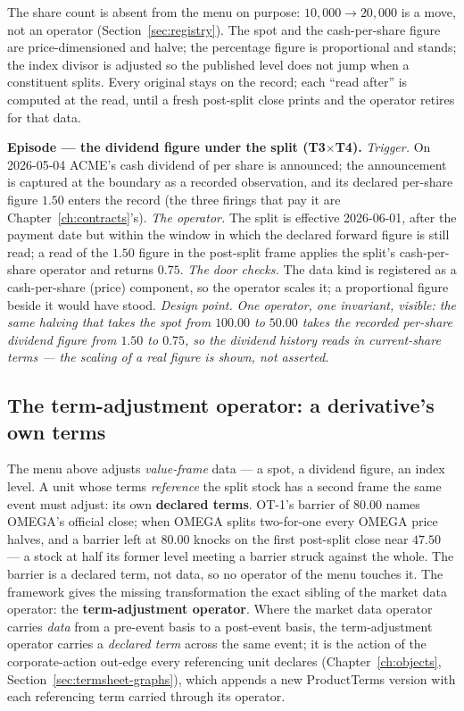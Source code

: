 \noindent The share count is absent from the menu on purpose: $10{,}000 \rightarrow
20{,}000$ is a move, not an operator (Section~\ref{sec:registry}). The spot and the
cash-per-share figure are price-dimensioned and halve; the percentage figure is
proportional and stands; the index divisor is adjusted so the published level does not jump
when a constituent splits. Every original stays on the record; each ``read after'' is
computed at the read, until a fresh post-split close prints and the operator retires for
that data.

\medskip\noindent\textbf{Episode --- the dividend figure under the split (T3$\times$T4).}
\emph{Trigger.} On 2026-05-04 ACME's cash dividend of  per share is announced;
the announcement is captured at the boundary as a recorded observation, and its declared
per-share figure $1.50$ enters the record (the three firings that pay it are
Chapter~\ref{ch:contracts}'s). \emph{The operator.} The split is effective 2026-06-01,
after the payment date but within the window in which the declared forward figure is still
read; a read of the $1.50$ figure in the post-split frame applies the split's
cash-per-share operator and returns $0.75$. \emph{The door checks.} The data kind is
registered as a cash-per-share (price) component, so the operator scales it; a proportional
figure beside it would have stood. \emph{Design point.} \emph{One operator, one invariant,
visible: the same halving that takes the spot from $100.00$ to $50.00$ takes the recorded
per-share dividend figure from $1.50$ to $0.75$, so the dividend history reads in
current-share terms --- the scaling of a real figure is shown, not asserted.}

\subsection{The term-adjustment operator: a derivative's own terms}\label{sec:term-operator}

The menu above adjusts \emph{value-frame} data --- a spot, a dividend figure, an index
level. A unit whose terms \emph{reference} the split stock has a second frame the same event
must adjust: its own \textbf{declared terms}. OT-1's barrier of $80.00$ names OMEGA's
official close; when OMEGA splits two-for-one every OMEGA price halves, and a barrier left at
$80.00$ knocks on the first post-split close near $47.50$ --- a stock at half its former level
meeting a barrier struck against the whole. The barrier is a declared term, not data, so
no operator of the menu touches it. The framework gives the missing transformation the exact
sibling of the market data operator: the \textbf{term-adjustment operator}. Where the market
data operator carries \emph{data} from a pre-event basis to a post-event basis, the
term-adjustment operator carries a \emph{declared term} across the same event; it is the
action of the corporate-action out-edge every referencing unit declares
(Chapter~\ref{ch:objects}, Section~\ref{sec:termsheet-graphs}), which appends a new
ProductTerms version with each referencing term carried through its operator.

